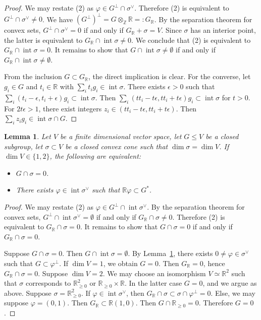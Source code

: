 \documentclass[12pt,reqno]{amsart}
\newcommand{\Z}{{\mathbb Z}}
\newcommand{\R}{{\mathbb R}}
\newcommand{\Int}{\operatorname{int}}
\theoremstyle{plain}
\newtheorem{lem}[thm]{Lemma}
\theoremstyle{definition}
\theoremstyle{remark}
\begin{document}
\begin{proof} We may restate (2) as $\varphi\in G^\perp\cap \sigma^\vee$. Therefore (2) is equivalent to $G^\perp\cap\sigma^\vee\ne 0$.
We have $(G^\perp)^\perp=G\otimes_\Z \R=:G_\R$. By the separation theorem for convex sets, $G^\perp\cap\sigma^\vee= 0$ if and only if 
$G_\R+ \sigma=V$. Since $\sigma$ has an interior point, the latter is equivalent to $G_\R\cap \Int\sigma\ne 0$.
We conclude that (2) is equivalent to $G_\R\cap \Int\sigma=0$.
It remains to show that $G\cap \Int\sigma\ne \emptyset$ if and only if 
$G_\R\cap \Int\sigma\ne \emptyset$. 

From the inclusion $G\subset G_\R$,
the direct implication is clear. For the converse, let $g_i\in G$ and $t_i\in \R$ with $\sum_it_ig_i\in \Int \sigma$. There exists $\epsilon>0$
such that $\sum_i(t_i-\epsilon,t_i+\epsilon)g_i\subset \Int\sigma$.
Then $\sum_i(tt_i-t\epsilon,tt_i+t\epsilon)g_i\subset \Int\sigma$ for $t>0$.
For $2t\epsilon> 1$, there exist integers $z_i\in (tt_i-t\epsilon,tt_i+t\epsilon)$. Then
$\sum_iz_ig_i\in \Int\sigma\cap G$.
\end{proof}

\begin{lem}\label{cc} Let $V$ be a finite dimensional vector space, let $G\le V$ be a closed subgroup, let $\sigma\subset V$ be a closed convex cone such that $\dim \sigma=\dim V$. If $\dim V\in \{1,2\}$, the following are equivalent:
\begin{itemize}
\item[(1)] $G\cap \sigma=0$. 
\item[(2)] There exists $\varphi\in \Int\sigma^\vee$ such that $\R \varphi\subset G^*$.
\end{itemize}
\end{lem}

\begin{proof} We may restate (2) as $\varphi\in G^\perp\cap \Int \sigma^\vee$. By the separation theorem for convex sets,
	$G^\perp\cap \Int \sigma^\vee =\emptyset$ if and only if 
	$G_\R\cap \sigma\ne 0$. Therefore (2) is equivalent to 
	$G_\R\cap \sigma= 0$. It remains to show that 
	$G\cap \sigma=0$ if and only if 
	$G_\R\cap \sigma=0$. 
	
	Suppose $G\cap \sigma=0$. Then $G\cap \Int\sigma=\emptyset$.
	By Lemma~\ref{cc}, there exists $0\ne \varphi\in \sigma^\vee$ 
	such that $G\subset \varphi^\perp$. If $\dim V=1$, we obtain $G=0$.
	Then $G_\R=0$, hence $G_\R\cap \sigma=0$. Suppose $\dim V=2$. We may 
	choose an isomorphism $V\simeq \R^2$ such that $\sigma$ corresponds to 
	$\R^2_{\ge 0}$ or $\R_{\ge 0}\times \R$. In the latter case $G=0$, and we argue as above. Suppose $\sigma=\R^2_{\ge 0}$. If $\varphi\in \Int\sigma^\vee$, then $G_\R\cap \sigma\subset \sigma\cap \varphi^\perp=0$. Else, we may suppose $\varphi=(0,1)$. Then 
	$G_\R\subset \R(1,0)$. Then $G\cap \R_{\ge 0}=0$. Therefore $G=0$.
\end{proof}
\end{document}
